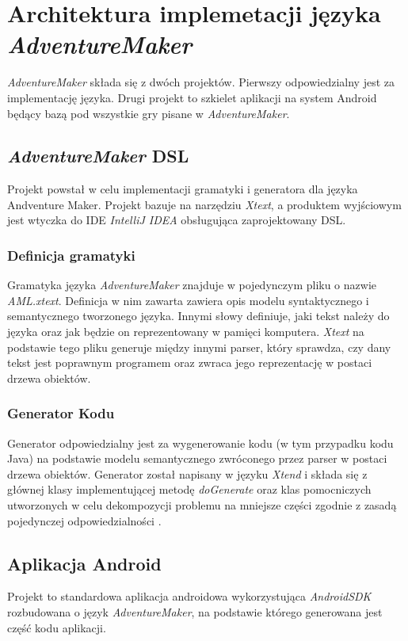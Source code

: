 \documentclass[openright]{xmgr}
\begin{document}
\chapter{Architektura implemetacji języka \textit{AdventureMaker}}

\textit{AdventureMaker} składa się z dwóch projektów. Pierwszy odpowiedzialny jest za implementację języka. Drugi projekt to szkielet aplikacji na system Android będący bazą pod wszystkie gry pisane w \textit{AdventureMaker}. 

\section{\textit{AdventureMaker} DSL} 
Projekt powstał w celu implementacji gramatyki i generatora dla języka Andventure Maker. Projekt bazuje na narzędziu \textit{Xtext}\cite{Xtext:2017:Doc}, a produktem wyjściowym jest wtyczka do IDE \textit{IntelliJ IDEA} obsługująca zaprojektowany DSL. 

\subsection{Definicja gramatyki} 

Gramatyka języka \textit{AdventureMaker} znajduje w pojedynczym pliku o nazwie \textit{AML.xtext}. Definicja w nim zawarta zawiera opis modelu syntaktycznego i semantycznego tworzonego języka. Innymi słowy definiuje, jaki tekst należy do języka oraz jak będzie on reprezentowany w pamięci komputera. \textit{Xtext} na podstawie tego pliku generuje między innymi parser, który sprawdza, czy dany tekst jest poprawnym programem oraz zwraca jego reprezentację w postaci drzewa obiektów.

\subsection{Generator Kodu}
Generator odpowiedzialny jest za wygenerowanie kodu (w tym przypadku kodu Java) na podstawie modelu semantycznego zwróconego przez parser w postaci drzewa obiektów. Generator został napisany w języku \textit{Xtend} i składa się z głównej klasy implementującej metodę \textit{doGenerate} oraz klas pomocniczych utworzonych w celu dekompozycji problemu na mniejsze części zgodnie z zasadą pojedynczej odpowiedzialności \cite{CleanCode:2005}.

\section{Aplikacja Android}
Projekt to standardowa aplikacja androidowa wykorzystująca \textit{AndroidSDK} rozbudowana o język \textit{AdventureMaker}, na podstawie którego generowana jest część kodu aplikacji.
\end{document}
